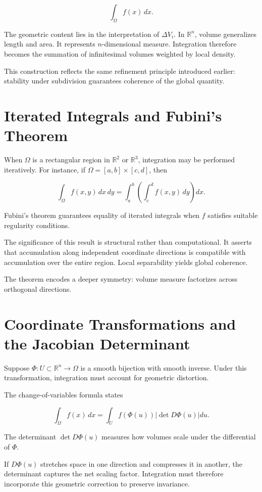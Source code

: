 \documentclass[12pt]{book}
\begin{document}
\[
\int_\Omega f(x)\, dx.
\]

The geometric content lies in the interpretation of $\Delta V_i$. In $\mathbb{R}^n$, volume generalizes length and area. It represents $n$-dimensional measure. Integration therefore becomes the summation of infinitesimal volumes weighted by local density.

This construction reflects the same refinement principle introduced earlier: stability under subdivision guarantees coherence of the global quantity.

\section{Iterated Integrals and Fubini's Theorem}

When $\Omega$ is a rectangular region in $\mathbb{R}^2$ or $\mathbb{R}^3$, integration may be performed iteratively. For instance, if $\Omega = [a,b] \times [c,d]$, then

\[
\int_\Omega f(x,y)\, dx\,dy
=
\int_a^b \left( \int_c^d f(x,y)\, dy \right) dx.
\]

Fubini's theorem guarantees equality of iterated integrals when $f$ satisfies suitable regularity conditions.

The significance of this result is structural rather than computational. It asserts that accumulation along independent coordinate directions is compatible with accumulation over the entire region. Local separability yields global coherence.

The theorem encodes a deeper symmetry: volume measure factorizes across orthogonal directions.

\section{Coordinate Transformations and the Jacobian Determinant}

Suppose $\Phi : U \subset \mathbb{R}^n \to \Omega$ is a smooth bijection with smooth inverse. Under this transformation, integration must account for geometric distortion.

The change-of-variables formula states

\[
\int_\Omega f(x)\, dx
=
\int_U f(\Phi(u)) \left| \det D\Phi(u) \right| du.
\]

The determinant $\det D\Phi(u)$ measures how volumes scale under the differential of $\Phi$.

If $D\Phi(u)$ stretches space in one direction and compresses it in another, the determinant captures the net scaling factor. Integration must therefore incorporate this geometric correction to preserve invariance.
\end{document}
